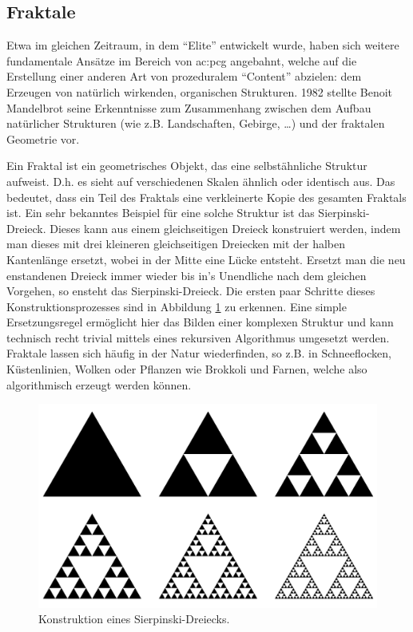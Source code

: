 \subsection{Fraktale}
Etwa im gleichen Zeitraum, in dem ``Elite'' entwickelt wurde, haben sich weitere fundamentale Ansätze im Bereich von \gls{ac:pcg} angebahnt,
welche auf die Erstellung einer anderen Art von prozeduralem ``Content'' abzielen: dem Erzeugen von natürlich wirkenden, organischen Strukturen.
1982 stellte Benoit Mandelbrot seine Erkenntnisse zum Zusammenhang zwischen dem Aufbau natürlicher Strukturen (wie z.B. Landschaften, Gebirge, \dots)
und der fraktalen Geometrie vor. \cite{19_mandelbrot}

Ein Fraktal ist ein geometrisches Objekt, das eine selbstähnliche Struktur aufweist. D.h. es sieht auf verschiedenen Skalen ähnlich oder identisch
aus. Das bedeutet, dass ein Teil des Fraktals eine verkleinerte Kopie des gesamten Fraktals ist. \cite{19_mandelbrot} Ein sehr bekanntes Beispiel
für eine solche Struktur ist das Sierpinski-Dreieck. Dieses kann aus einem gleichseitigen Dreieck konstruiert werden,
indem man dieses mit drei kleineren gleichseitigen Dreiecken mit der halben Kantenlänge ersetzt, wobei in der Mitte eine Lücke entsteht. Ersetzt man
die neu enstandenen Dreieck immer wieder bis in's Unendliche nach dem gleichen Vorgehen, so ensteht das Sierpinski-Dreieck. \cite{37_sierpinski}
Die ersten paar Schritte dieses Konstruktionsprozesses sind in Abbildung \ref{fig:sierpinski_triangle} zu erkennen. Eine simple Ersetzungsregel ermöglicht
hier das Bilden einer komplexen Struktur und kann technisch recht trivial mittels eines rekursiven Algorithmus umgesetzt werden. Fraktale lassen
sich häufig in der Natur wiederfinden, so z.B. in Schneeflocken, Küstenlinien, Wolken oder Pflanzen wie Brokkoli und Farnen, welche also algorithmisch
erzeugt werden können. \cite{19_mandelbrot}

\begin{figure}[t]
    \centering
    \includegraphics[width=(\imgWidth/2)]{images/sierpinski_triangle.pdf}
    \caption{Konstruktion eines Sierpinski-Dreiecks.}
    \label{fig:sierpinski_triangle}
\end{figure}

